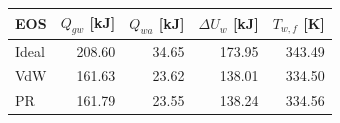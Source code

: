 \begin{tabular}{lrrrr}
\toprule
EOS & $Q_{gw}$ [kJ] & $Q_{wa}$ [kJ] & $\Delta U_w$ [kJ] & $T_{w,f}$ [K] \\
\midrule
Ideal & 208.60 & 34.65 & 173.95 & 343.49 \\
VdW & 161.63 & 23.62 & 138.01 & 334.50 \\
PR & 161.79 & 23.55 & 138.24 & 334.56 \\
\bottomrule
\end{tabular}
